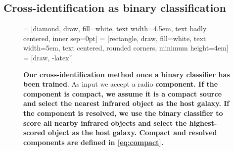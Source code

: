 \documentclass[fleqn,usenatbib,usedcolumn]{mnras}
\newcommand{\edited}[1]{{\bf {#1}}}
\begin{document}
  \subsection{Cross-identification as binary classification}\label{sec:xid-as-binary-classification}
    \begin{figure}
      \centering
       = [diamond, draw, fill=white,
          text width=4.5em, text badly centered, inner sep=0pt]
       = [rectangle, draw, fill=white,
          text width=5em, text centered, rounded corners, minimum height=4em]
       = [draw, -latex']
      \caption{\edited{Our cross-identification method once a binary classifier has been trained}. As
        input we accept a radio \edited{component. If the component is compact, we assume it is a compact source and select
        the nearest infrared object as the host galaxy. If the component is
        resolved, we use the binary classifier to score all nearby infrared objects
        and select the highest-scored object as the host galaxy. Compact and resolved components are defined in \autoref{eq:compact}.}}
      \label{fig:flowchart}
    \end{figure}
\end{document}
